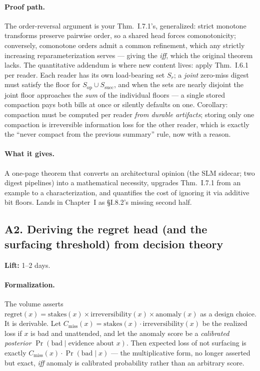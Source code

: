 \documentclass[11pt,a4paper]{article}
\newcommand{\lift}[1]{\noindent\textbf{Lift:} #1.}
\newcommand{\gives}{\paragraph{What it gives.}}
\newcommand{\form}{\paragraph{Formalization.}}
\newcommand{\proofpath}{\paragraph{Proof path.}}
\begin{document}
\proofpath The order-reversal argument is your Thm.~I.7.1's, generalized: strict monotone transforms preserve pairwise order, so a shared head forces comonotonicity; conversely, comonotone orders admit a common refinement, which any strictly increasing reparameterization serves --- giving the \emph{iff}, which the original theorem lacks. The quantitative addendum is where new content lives: apply Thm.~I.6.1 per reader. Each reader has its own load-bearing set $S_r$; a \emph{joint} zero-miss digest must satisfy the floor for $S_{\mathrm{op}} \cup S_{\mathrm{succ}}$, and when the sets are nearly disjoint the joint floor approaches the \emph{sum} of the individual floors --- a single stored compaction pays both bills at once or silently defaults on one. Corollary: compaction must be computed per reader \emph{from durable artifacts}; storing only one compaction is irreversible information loss for the other reader, which is exactly the ``never compact from the previous summary'' rule, now with a reason.

\gives A one-page theorem that converts an architectural opinion (the SLM sidecar; two digest pipelines) into a mathematical necessity, upgrades Thm.~I.7.1 from an example to a characterization, and quantifies the cost of ignoring it via additive bit floors. Lands in Chapter~I as \S I.8.2's missing second half.

\subsection{A2. Deriving the regret head (and the surfacing threshold) from decision theory}
\lift{1--2 days}

\form The volume asserts $\mathrm{regret}(x) = \mathrm{stakes}(x)\times\mathrm{irreversibility}(x)\times\mathrm{anomaly}(x)$ as a design choice. It is derivable. Let $C_{\mathrm{miss}}(x) = \mathrm{stakes}(x)\cdot\mathrm{irreversibility}(x)$ be the realized loss if $x$ is bad and unattended, and let the anomaly score be a \emph{calibrated posterior} $\Pr(\mathrm{bad}\mid \text{evidence about } x)$. Then expected loss of not surfacing is exactly $C_{\mathrm{miss}}(x)\cdot\Pr(\mathrm{bad}\mid x)$ --- the multiplicative form, no longer asserted but exact, \emph{iff} anomaly is calibrated probability rather than an arbitrary score.
\end{document}
